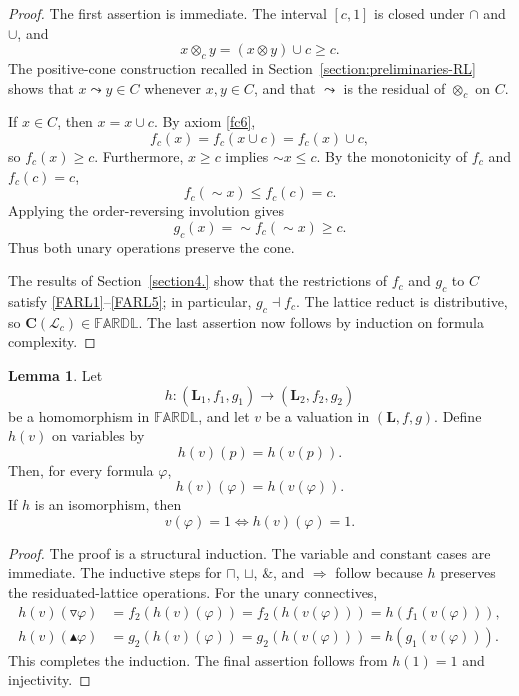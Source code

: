 \documentclass[final,12pt,times]{elsarticle}
\theoremstyle{plain}
\theoremstyle{definition}
\newtheorem{lemma}[definition]{Lemma}
\theoremstyle{break}
\newcommand{\FARDL}{\mathbb{FARDL}}
\newcommand{\Cfun}{\mathbf C}
\begin{document}
\begin{proof}
The first assertion is immediate.  The interval \([c,1]\) is closed under
\(\cap\) and \(\cup\), and
\[
 x\otimes_c y=(x\otimes y)\cup c\geq c.
\]
The positive-cone construction recalled in Section~\ref{section:preliminaries-RL} shows that
\(x\leadsto y\in C\) whenever \(x,y\in C\), and that \(\leadsto\) is the
residual of \(\otimes_c\) on \(C\).

If \(x\in C\), then \(x=x\cup c\).  By axiom \eqref{fc6},
\[
 f_c(x)=f_c(x\cup c)=f_c(x)\cup c,
\]
so \(f_c(x)\geq c\).  Furthermore, \(x\geq c\) implies
\({\sim}x\leq c\).  By the monotonicity of \(f_c\) and \(f_c(c)=c\),
\[
 f_c({\sim}x)\leq f_c(c)=c.
\]
Applying the order-reversing involution gives
\[
 g_c(x)={\sim}f_c({\sim}x)\geq c.
\]
Thus both unary operations preserve the cone.

The results of Section~\ref{section4.} show that the restrictions of \(f_c\)
and \(g_c\) to \(C\) satisfy \eqref{FARL1}--\eqref{FARL5}; in particular,
\(g_c\dashv f_c\).  The lattice reduct is distributive, so
\(\Cfun(\mathcal{\mathscr L}_c)\in\FARDL\).  The last assertion now follows
by induction on formula complexity.
\end{proof}

\begin{lemma}
\label{lem:formula-transport}
Let
\[
 h:(\mathbf L_1,f_1,g_1)\longrightarrow(\mathbf L_2,f_2,g_2)
\]
be a homomorphism in \(\FARDL\), and let \(v\) be a valuation in
\((\mathbf L,f,g)\).  Define \(h(v)\) on variables by
\[
 h(v)(p)=h(v(p)).
\]
Then, for every formula \(\varphi\),
\[
 h(v)(\varphi)=h(v(\varphi)).
\]
If \(h\) is an isomorphism, then
\[
 v(\varphi)=1
 \Longleftrightarrow
 h(v)(\varphi)=1.
\]
\end{lemma}

\begin{proof}
The proof is a structural induction.  The variable and constant cases are
immediate.  The inductive steps for \(\sqcap\), \(\sqcup\), \(\mathbin{\&}\),
and \(\Rightarrow\) follow because \(h\) preserves the residuated-lattice
operations.  For the unary connectives,
\begin{align*}
 h(v)(\triangledown\varphi)
 &=f_2(h(v)(\varphi))
  =f_2(h(v(\varphi)))
  =h(f_1(v(\varphi))),\\
 h(v)(\blacktriangle\varphi)
 &=g_2(h(v)(\varphi))
  =g_2(h(v(\varphi)))
  =h(g_1(v(\varphi))).
\end{align*}
This completes the induction.  The final assertion follows from
\(h(1)=1\) and injectivity.
\end{proof}
\end{document}
